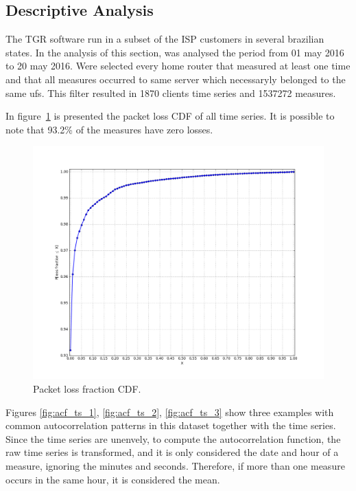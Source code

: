 \subsection{Descriptive Analysis}

The TGR software run in a subset of the ISP customers in several brazilian states. In the analysis of this section, was analysed the period from 01 may 2016 to 20 may 2016. Were selected every home router that measured at least one time and that all measures occurred to same server which necessaryly belonged to the same ufs. This filter resulted in 1870 clients time series and 1537272 measures.

In figure~\ref{fig:loss_fraction_cdf} is presented the packet loss CDF of all time series. It is possible to note that 93.2\% of the measures have zero losses.

\begin{figure}[H]
    \centering
    \includegraphics[width=1.0\textwidth]{./figures/loss_cdf.png}
    \caption{Packet loss fraction CDF.}
    \label{fig:loss_fraction_cdf}
\end{figure}

Figures \ref{fig:acf_ts_1}, \ref{fig:acf_ts_2}, \ref{fig:acf_ts_3} show three examples with common autocorrelation patterns in this dataset together with the time series. Since the time series are unenvely, to compute the autocorrelation function, the raw time series is transformed, and it is only considered the date and hour of a measure, ignoring the minutes and seconds. Therefore, if more than one measure occurs in the same hour, it is considered the mean.

